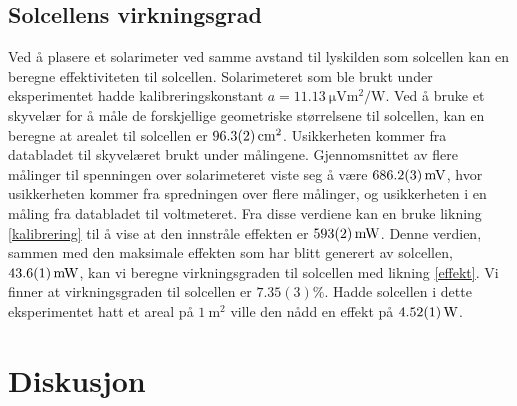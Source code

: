 \documentclass[%
 reprint,
 amsmath,amssymb,
 aps,
 norsk,
 booktabs
]{revtex4-1}
\begin{document}
\subsection{Solcellens virkningsgrad}
Ved å plasere et solarimeter ved samme avstand til lyskilden som solcellen kan en beregne effektiviteten til solcellen. Solarimeteret som ble brukt under eksperimentet hadde kalibreringskonstant $a=\SI{11.13}{\micro\volt\meter^2\per\watt}$. Ved å bruke et skyvelær for å måle de forskjellige geometriske størrelsene til solcellen, kan en beregne at arealet til solcellen er $\SI{96.3\pm0.2}{\centi\meter^2}$. Usikkerheten kommer fra databladet til skyvelæret brukt under målingene. Gjennomsnittet av flere målinger til spenningen over solarimeteret viste seg å være $\SI{686.2\pm0.3}{\milli\volt}$, hvor usikkerheten kommer fra spredningen over flere målinger, og usikkerheten i en måling fra databladet til voltmeteret. Fra disse verdiene kan en bruke likning \eqref{kalibrering} til å vise at den innstråle effekten er
$\SI{593\pm2}{\milli\watt}$. Denne verdien, sammen med den maksimale effekten som har blitt generert av solcellen, $\SI{43.6\pm0.1}{\milli\watt}$, kan vi beregne virkningsgraden til solcellen med likning \eqref{effekt}. Vi finner at virkningsgraden til solcellen er $7.35(3)\%$. Hadde solcellen i dette eksperimentet hatt et areal på $\SI{1}{\meter^2}$ ville den nådd en effekt på $\SI{4.52\pm0.01}{\watt}$.
\section{Diskusjon}
\end{document}

